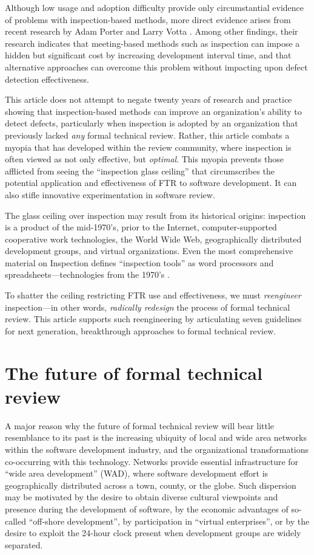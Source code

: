 Although low usage and adoption difficulty provide only circumstantial
evidence of problems with inspection-based methods, more direct evidence
arises from recent research by Adam Porter \cite{Porter95} and
Larry Votta \cite{Votta93}. Among other findings, their research indicates
that meeting-based methods such as inspection can impose a hidden but
significant cost by increasing development interval time, and that
alternative approaches can overcome this problem without impacting upon
defect detection effectiveness.

This article does not attempt to negate twenty years of research and
practice showing that inspection-based methods can improve an
organization's ability to detect defects, particularly when inspection is
adopted by an organization that previously lacked {\em any} formal
technical review. Rather, this article combats a myopia that has developed
within the review community, where inspection is often viewed as not only
effective, but {\em optimal}. This myopia prevents those afflicted from
seeing the ``inspection glass ceiling'' that circumscribes the potential
application and effectiveness of FTR to software development.  It can also
stifle innovative experimentation in software review.

The glass ceiling over inspection may result from its historical origins:
inspection is a product of the mid-1970's, prior to the Internet,
computer-supported cooperative work technologies, the World Wide Web,
geographically distributed development groups, and virtual
organizations. Even the most comprehensive material on Inspection
defines ``inspection tools'' as word processors and
spreadsheets---technologies from the 1970's \cite{Gilb93}. 

To shatter the ceiling restricting FTR use and effectiveness, we must {\em
  reengineer} inspection---in other words, {\em radically redesign} the
process of formal technical review.  This article supports such
reengineering by articulating seven guidelines for next generation,
breakthrough approaches to formal technical review.


\section*{The future of formal technical review}

A major reason why the future of formal technical review will bear little
resemblance to its past is the increasing ubiquity of local and wide area
networks within the software development industry, and the organizational
transformations co-occurring with this technology.  Networks provide
essential infrastructure for ``wide area development'' (WAD), where
software development effort is geographically distributed across a town,
county, or the globe.  Such dispersion may be motivated by the desire to
obtain diverse cultural viewpoints and presence during the development of
software, by the economic advantages of so-called ``off-shore
development'', by participation in ``virtual enterprises'', or by the
desire to exploit the 24-hour clock present when development groups are
widely separated.

